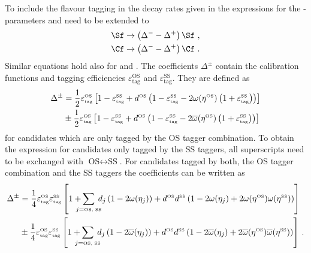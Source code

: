 To include the flavour tagging in the decay rates given in  the expressions for the \CP-parameters \Sf and \Cf need to be extended to
\begin{equation}
\begin{aligned}
\Sf&\to\left(\Delta^--\Delta^+\right)\Sf\,\,,\\
\Cf&\to\left(\Delta^--\Delta^+\right)\Cf\,\,.\label{eq:decRateCorrectFT}
\end{aligned}
\end{equation}
Similar equations hold also for \Sfbar and \Cfbar.
The coefficients $\Delta^\pm$ contain the calibration functions and tagging efficiencies $\varepsilon_{\text{tag}}^{\text{OS}}$ and $\varepsilon_{\text{tag}}^{\text{SS}}$.
They are defined as
\begin{align}
\Delta^\pm&=\frac{1}{2}\varepsilon_{\text{\tiny tag}}^{\text{\tiny OS}}\left[1-\varepsilon_{\text{\tiny tag}}^{\text{\tiny SS}}+d^{\text{\tiny OS}}\left(1-\varepsilon_{\text{\tiny tag}}^{\text{\tiny SS}}-2\omega(\eta^{\text{\tiny OS}})\left(1+\varepsilon_{\text{\tiny tag}}^{\text{\tiny SS}}\right)\right)\right]\nonumber\\
&\pm\frac{1}{2}\varepsilon_{\text{\tiny tag}}^{\text{\tiny OS}}\left[1-\varepsilon_{\text{\tiny tag}}^{\text{\tiny SS}}+d^{\text{\tiny OS}}\left(1-\varepsilon_{\text{\tiny tag}}^{\text{\tiny SS}}-2\overline{\omega}(\eta^{\text{\tiny OS}})\left(1+\varepsilon_{\text{\tiny tag}}^{\text{\tiny SS}}\right)\right)\right]
\end{align}
for candidates which are only tagged by the OS tagger combination.
To obtain the expression for candidates only tagged by the SS taggers, all superscripts need to be exchanged with $\text{OS}\leftrightarrow\text{SS}$.
For candidates tagged by both, the OS tagger combination and the SS taggers the coefficients can be written as
\begin{align}
\Delta^\pm&=\frac{1}{4}\varepsilon_{\text{\tiny tag}}^{\text{\tiny OS}}\varepsilon_{\text{\tiny tag}}^{\text{\tiny SS}}\left[1+\hspace{-3mm}\sum_{j=\text{\tiny OS, SS}}\hspace{-2mm}d_j\left(1-2\omega(\eta_j)\right)+d^{\text{\tiny OS}}d^{\text{\tiny SS}}\left(1-2\omega(\eta_j)+2\omega(\eta^{\text{\tiny OS}})\omega(\eta^{\text{\tiny SS}})\right)\right]\nonumber\\
&\pm\frac{1}{4}\varepsilon_{\text{\tiny tag}}^{\text{\tiny OS}}\varepsilon_{\text{\tiny tag}}^{\text{\tiny SS}}\left[1+\hspace{-3mm}\sum_{j=\text{\tiny OS, SS}}\hspace{-2mm}d_j\left(1-2\overline{\omega}(\eta_j)\right)+d^{\text{\tiny OS}}d^{\text{\tiny SS}}\left(1-2\overline{\omega}(\eta_j)+2\overline{\omega}(\eta^{\text{\tiny OS}})\overline{\omega}(\eta^{\text{\tiny SS}})\right)\right]\,.
\end{align}

